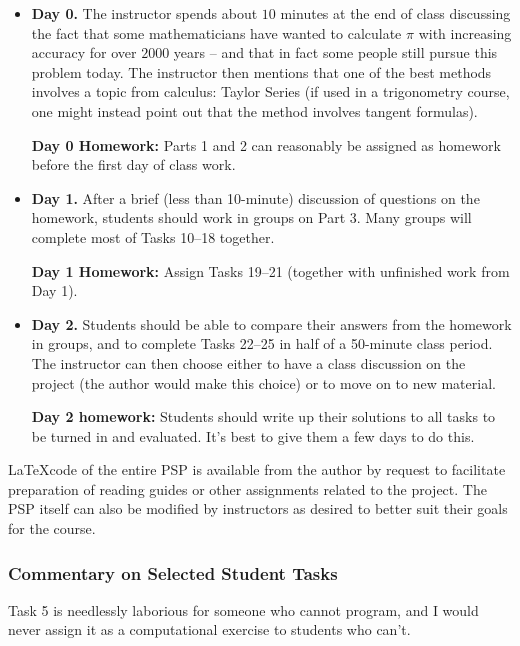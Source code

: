 \documentclass[11pt]{article}
\begin{document}
\begin{itemize}
\item \textbf{Day 0.}  The instructor spends about $10$ minutes at the end of class discussing the fact that some mathematicians have wanted to calculate $\pi$ with increasing accuracy for over $2000$ years -- and that in fact some people still pursue this problem today. The instructor then mentions that one of the best methods involves a topic from calculus: Taylor Series (if used in a trigonometry course, one might instead point out that the method involves tangent formulas).

\textbf{Day 0 Homework:}  Parts 1 and 2 can reasonably be assigned as homework before the first day of class work.

\item \textbf{Day 1.} After a brief (less than 10-minute) discussion of questions on the homework, students should work in groups on Part 3. Many groups will complete most of Tasks 10--18 together.

\textbf{Day 1 Homework:} Assign Tasks 19--21 (together with unfinished work from Day 1).

\item \textbf{Day 2.} Students should be able to compare their answers from the homework in groups, and to complete Tasks 22--25 in half of a 50-minute class period.  The instructor can then choose either to have a class discussion on the project (the author would make this choice) or to move on to new material.

\textbf{Day 2 homework:} Students should write up their solutions to all tasks to be turned in and evaluated.  It's best to give them a few days to do this.

\end{itemize}

 \LaTeX code of the entire PSP is available from the author by request to facilitate preparation of reading guides or other assignments related to the project. The PSP itself can also be modified by instructors as desired to better suit their goals for the course.

\subsubsection*{Commentary on Selected Student Tasks}

Task 5 is needlessly laborious for someone who cannot program, and I would never assign it as a computational exercise to students who can't.
\end{document}
